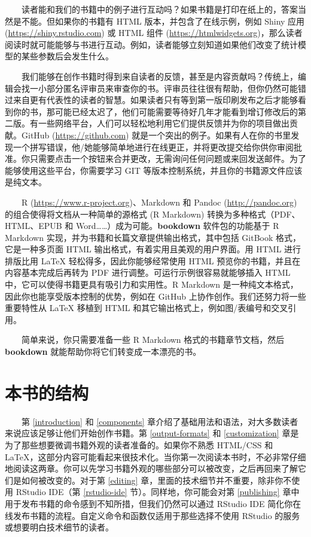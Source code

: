 \documentclass[
  12pt,
]{krantz}
\theoremstyle{definition}
\theoremstyle{definition}
\theoremstyle{definition}
\theoremstyle{definition}
\theoremstyle{remark}
\begin{document}
  读者能和我们的书籍中的例子进行互动吗？如果书籍是打印在纸上的，答案当然是不能。但如果你的书籍有 HTML 版本，并包含了在线示例，例如 Shiny 应用 (\url{https://shiny.rstudio.com}) 或 HTML 组件 (\url{https://htmlwidgets.org})，那么读者阅读时就可能能够与书进行互动。例如，读者能够立刻知道如果他们改变了统计模型的某些参数后会发生什么。

  我们能够在创作书籍时得到来自读者的反馈，甚至是内容贡献吗？传统上，编辑会找一小部分匿名评审员来审查你的书。评审员往往很有帮助，但你仍然可能错过来自更有代表性的读者的智慧。如果读者只有等到第一版印刷发布之后才能够看到你的书，那可能已经太迟了，他们可能需要等待好几年才能看到增订修改后的第二版。有一些网络平台，人们可以轻松地利用它们提供反馈并为你的项目做出贡献。GitHub (\url{https://github.com}) 就是一个突出的例子。如果有人在你的书里发现一个拼写错误，他/她能够简单地进行在线更正，并将更改提交给你供你审阅批准。你只需要点击一个按钮来合并更改，无需询问任何问题或来回发送邮件。为了能够使用这些平台，你需要学习 GIT 等版本控制系统，并且你的书籍源文件应该是纯文本。

  R (\url{https://www.r-project.org})、Markdown 和 Pandoc (\url{http://pandoc.org}) 的组合使得将文档从一种简单的源格式 (R Markdown) 转换为多种格式（PDF、HTML、EPUB 和 Word\ldots\ldots）成为可能。\textbf{bookdown} 软件包的功能基于 R Markdown 实现，并为书籍和长篇文章提供输出格式，其中包括 GitBook 格式，它是一种多页面 HTML 输出格式，有着实用且美观的用户界面。用 HTML 进行排版比用 LaTeX 轻松得多，因此你能够经常使用 HTML 预览你的书籍，并且在内容基本完成后再转为 PDF 进行调整。可运行示例很容易就能够插入 HTML 中，它可以使得书籍更具有吸引力和实用性。R Markdown 是一种纯文本格式，因此你也能享受版本控制的优势，例如在 GitHub 上协作创作。我们还努力将一些重要特性从 LaTeX 移植到 HTML 和其它输出格式上，例如图/表编号和交叉引用。

  简单来说，你只需要准备一些 R Markdown 格式的书籍章节文档，然后 \textbf{bookdown} 就能帮助你将它们转变成一本漂亮的书。

\hypertarget{ux672cux4e66ux7684ux7ed3ux6784}{%
\section*{本书的结构}\label{ux672cux4e66ux7684ux7ed3ux6784}}


  第 \ref{introduction} 和 \ref{components} 章介绍了基础用法和语法，对大多数读者来说应该足够让他们开始创作书籍。第 \ref{output-formats} 和 \ref{customization} 章是为了那些想要微调书籍外观的读者准备的。如果你不熟悉 HTML/CSS 和 LaTeX，这部分内容可能看起来很技术化。当你第一次阅读本书时，不必非常仔细地阅读这两章。你可以先学习书籍外观的哪些部分可以被改变，之后再回来了解它们是如何被改变的。对于第 \ref{editing} 章，里面的技术细节并不重要，除非你不使用 RStudio IDE（第 \ref{rstudio-ide} 节）。同样地，你可能会对第 \ref{publishing} 章中用于发布书籍的命令感到不知所措，但我们仍然可以通过 RStudio IDE 简化你在线发布书籍的流程。自定义命令和函数仅适用于那些选择不使用 RStudio 的服务或想要明白技术细节的读者。
\end{document}
